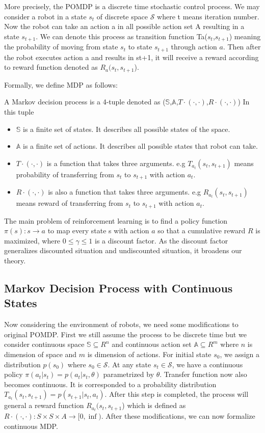 \documentclass[officiallayout]{tktla}
\begin{document}
More precisely, the POMDP is a discrete time stochastic control process. We may consider a robot in a state $s_t$ of discrete space $\mathcal{S}$ where t means iteration number. Now the robot can take an action a in all possible action set A resulting in a state $s_{t+1}$. We can denote this process as transition function Ta($s_t$,$s_{t+1}$) meaning the probability of moving from state $s_t$ to state $s_{t+1}$ through action $a$. Then after the robot executes action a and results in st+1, it will receive a reward according to reward function denoted as $R_a(s_t,s_{t+1}$).

Formally, we define MDP as follows:

A Markov decision process is a 4-tuple denoted as ($\mathbb{S}$,$\mathbb{A}$,$T\cdot(\cdot,\cdot)$,$R\cdot(\cdot,\cdot)$)
In this tuple
\begin{itemize}
\item	$\mathbb{S}$ is a finite set of states. It describes all possible states of the space.
\item	$\mathbb{A}$ is a finite set of actions. It describes all possible states that robot can take.
\item	$T\cdot(\cdot,\cdot)$ is a function that takes three arguments. e.g $T_{a_t}(s_t,s_{t+1})$ means probability of transferring from $s_t$ to $s_{t+1}$ with action $a_t$.
\item	$R\cdot(\cdot,\cdot)$ is also a function that takes three arguments. e.g $R_{a_t}(s_t,s_{t+1})$ means reward of transferring from $s_t$ to $s_{t+1}$ with action $a_t$.
\end{itemize}


The main problem of reinforcement learning is to find a policy function $\pi(s) : s \rightarrow a$ to map every state s with action $a$ so that a cumulative reward $R$ is maximized, where $0 \leq \gamma \leq 1$ is a discount factor. As the discount factor generalizes discounted situation and undiscounted situation, it broadens our theory.

\subsection{Markov Decision Process with Continuous States}
Now considering the environment of robots, we need some modifications to original POMDP. First we still assume the process to be discrete time but we consider continuous space $\mathbb{S} \subseteq R^n$ and continuous action set $\mathbb{A} \subseteq R^m$ where $n$ is dimension of space and $m$ is dimension of actions. For initial state $s_0$, we assign a distribution $p(s_0)$ where $s_0 \in \mathcal{S}$. At any state $s_t \in \mathcal{S}$, we have a continuous policy $\pi(a_t|s_t) = p(a_t|s_t,\theta)$ parametrized by $\theta$. Transfer function now also becomes continuous. It is corresponded to a probability distribution $T_{a_t}(s_t,s_{t+1}) = p(s_{t+1}|s_t,a_t)$. After this step is completed, the process will general a reward function $R_{a_t}(s_t,s_{t+1}$) which is defined as $R\cdot(\cdot,\cdot) : S  \times S \times A \rightarrow [0,\inf)$.
After these modifications, we can now formalize continuous MDP.
\end{document}
